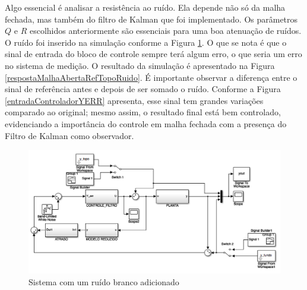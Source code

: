 Algo essencial é analisar a resistência ao ruído. Ela depende não só da malha fechada, mas também do filtro de Kalman que foi implementado. Os parâmetros $Q$ e $R$ escolhidos anteriormente são essenciais para uma boa atenuação de ruídos. O ruído foi inserido na simulação conforme a Figura \ref{simulacaoComRuidoSimulink}. O que se nota é que o sinal de entrada do bloco de controle sempre terá algum erro, o que seria um erro no sistema de medição. O resultado da simulação é apresentado na Figura \ref{respostaMalhaAbertaRefTopoRuido}. É importante observar a diferença entre o sinal de referência antes e depois de ser somado o ruído. Conforme a Figura \ref{entradaControladorYERR} apresenta, esse sinal tem grandes variações comparado ao original; mesmo assim, o resultado final está bem controlado, evidenciando a importância do controle em malha fechada com a presença do Filtro de Kalman como observador. 

\begin{figure}[!ht]
\centering
\caption{Sistema com um ruído branco adicionado\label{simulacaoComRuidoSimulink}}
\includegraphics[width=0.8\linewidth]{figs/resultados/simulacao/simulacaoComRuido}
\end{figure}


